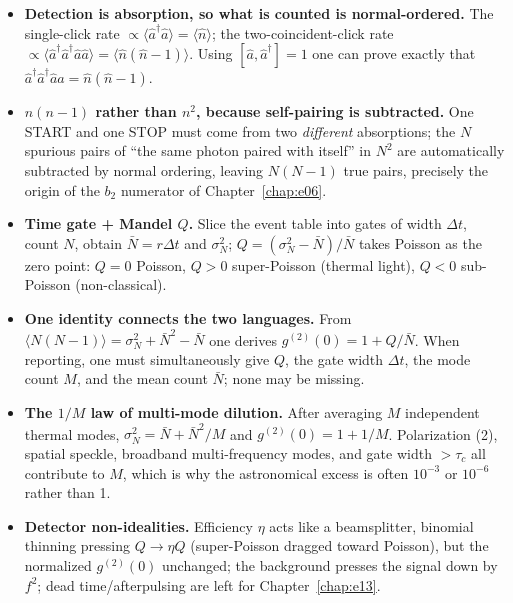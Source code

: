 \begin{itemize}
  \item \textbf{Detection is absorption, so what is counted is normal-ordered.} The single-click rate \(\propto\langle\hat a^\dagger\hat a\rangle=\langle\hat n\rangle\); the two-coincident-click rate \(\propto\langle\hat a^\dagger\hat a^\dagger\hat a\hat a\rangle=\langle\hat n(\hat n-1)\rangle\). Using \([\hat a,\hat a^\dagger]=1\) one can prove exactly that \(\hat a^\dagger\hat a^\dagger\hat a\hat a=\hat n(\hat n-1)\).
  \item \textbf{\(n(n-1)\) rather than \(n^2\), because self-pairing is subtracted.} One START and one STOP must come from two \emph{different} absorptions; the \(N\) spurious pairs of ``the same photon paired with itself'' in \(N^2\) are automatically subtracted by normal ordering, leaving \(N(N-1)\) true pairs, precisely the origin of the \(b_2\) numerator of Chapter~\ref{chap:e06}.
  \item \textbf{Time gate + Mandel \(Q\).} Slice the event table into gates of width \(\Delta t\), count \(N\), obtain \(\bar N=r\Delta t\) and \(\sigma_N^2\); \(Q=(\sigma_N^2-\bar N)/\bar N\) takes Poisson as the zero point: \(Q=0\) Poisson, \(Q>0\) super-Poisson (thermal light), \(Q<0\) sub-Poisson (non-classical).
  \item \textbf{One identity connects the two languages.} From \(\langle N(N-1)\rangle=\sigma_N^2+\bar N^2-\bar N\) one derives \(g^{(2)}(0)=1+Q/\bar N\). When reporting, one must simultaneously give \(Q\), the gate width \(\Delta t\), the mode count \(M\), and the mean count \(\bar N\); none may be missing.
  \item \textbf{The \(1/M\) law of multi-mode dilution.} After averaging \(M\) independent thermal modes, \(\sigma_N^2=\bar N+\bar N^2/M\) and \(g^{(2)}(0)=1+1/M\). Polarization (2), spatial speckle, broadband multi-frequency modes, and gate width \(>\tau_c\) all contribute to \(M\), which is why the astronomical excess is often \(10^{-3}\) or \(10^{-6}\) rather than 1.
  \item \textbf{Detector non-idealities.} Efficiency \(\eta\) acts like a beamsplitter, binomial thinning pressing \(Q\to\eta Q\) (super-Poisson dragged toward Poisson), but the normalized \(g^{(2)}(0)\) unchanged; the background presses the signal down by \(f^2\); dead time/afterpulsing are left for Chapter~\ref{chap:e13}.
\end{itemize}


